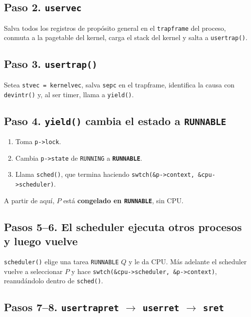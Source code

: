 \documentclass[11pt,a4paper]{article}
\begin{document}
\subsection*{Paso 2. \texttt{uservec}}

Salva todos los registros de propósito general en el \texttt{trapframe}
del proceso, conmuta a la pagetable del kernel, carga el stack del
kernel y salta a \texttt{usertrap()}.

\subsection*{Paso 3. \texttt{usertrap()}}

Setea \texttt{stvec = kernelvec}, salva \texttt{sepc} en el trapframe,
identifica la causa con \texttt{devintr()} y, al ser timer, llama a
\texttt{yield()}.

\subsection*{Paso 4. \texttt{yield()} cambia el estado a \texttt{RUNNABLE}}

\begin{enumerate}[leftmargin=*,nosep]
    \item Toma \texttt{p->lock}.
    \item Cambia \texttt{p->state} de \texttt{RUNNING} a
        \textbf{\texttt{RUNNABLE}}.
    \item Llama \texttt{sched()}, que termina haciendo
        \texttt{swtch(\&p->context, \&cpu->scheduler)}.
\end{enumerate}

A partir de aquí, $P$ está \textbf{congelado en \texttt{RUNNABLE}}, sin
CPU.

\subsection*{Pasos 5--6. El scheduler ejecuta otros procesos y luego vuelve}

\texttt{scheduler()} elige una tarea \texttt{RUNNABLE} $Q$ y le da CPU.
Más adelante el scheduler vuelve a seleccionar $P$ y hace
\texttt{swtch(\&cpu->scheduler, \&p->context)}, reanudándolo dentro de
\texttt{sched()}.

\subsection*{Pasos 7--8. \texttt{usertrapret} $\rightarrow$ \texttt{userret} $\rightarrow$ \texttt{sret}}
\end{document}
